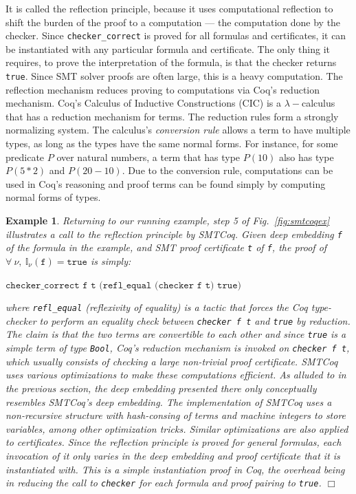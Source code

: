 \documentclass{article}
\newtheorem{example}{Example}[section]
\begin{document}
\begin{enumerate}
	It is called the reflection 
	principle, because it uses 
	computational reflection 
	to shift the burden of the 
	proof to a computation --- 
	the computation done by 
	the checker. Since 
	\texttt{checker\_correct}
	is proved for all formulas 
	and certificates, it can be 
	instantiated with any 
	particular formula and 
	certificate. The only thing it 
	requires, to 
	prove the interpretation of 
	the formula, is that the checker
	returns \texttt{true}.
	Since SMT solver proofs are 
	often large, this is a 
	heavy computation. The
	reflection mechanism reduces
	proving to computations via 
	Coq's reduction mechanism.
	Coq's Calculus of Inductive 
	Constructions (CIC) is a 
	$\lambda-$calculus that has a 
	reduction mechanism for terms. The
	reduction rules form a strongly 
	normalizing system. The calculus's
	\textit{conversion rule} allows a 
	term to have multiple types, as long as 
	the types have the same normal forms. 
	For instance, for some predicate $P$ 
	over natural numbers, a term that 
	has type $P(10)$ also has type 
	$P(5*2)$ and $P(20-10)$. Due 
	to the conversion rule, 
	computations can be used in Coq's 
	reasoning and proof terms can be 
	found simply by computing normal 
	forms of types.
\end{enumerate}
	
	\begin{example}
	\em Returning to our running example, 
	step 5 of 
	Fig.~\ref{fig:smtcoqex} illustrates
	a call to the reflection principle by
	SMTCoq. Given 
	deep embedding \texttt{f}
	of the formula in the example, and 
	SMT proof certificate \texttt{t} of 
	\texttt{f}, the proof of $\forall\ \nu,\ 
	\mathbb{I}_{\nu}(\texttt{f}) = 
	\texttt{true}$ is simply:
	\begin{center}
		$\texttt{checker\_correct f t
			(refl\_equal (checker f t) true)}$
	\end{center}
	where \texttt{refl\_equal} 
	(reflexivity of equality) is a tactic
	that forces the Coq type-checker to 
	perform an equality check between 
	\texttt{checker f t} and 
	\texttt{true} by reduction. 
	The claim is that the two 
	terms are convertible to each other
	and since \texttt{true} is a simple 
	term of type \texttt{Bool}, 
	Coq's reduction mechanism is 
	invoked on \texttt{checker f t},
	which usually consists of checking
	a large non-trivial proof certificate. 
	SMTCoq uses various optimizations 
	to make these computations efficient.
	As alluded to in the previous section,
	the deep embedding presented there 
	only conceptually resembles SMTCoq's
	deep embedding. The implementation 
	of SMTCoq uses a non-recursive 
	structure with hash-consing of terms
	and machine integers to store variables,
	among other optimization tricks.
	Similar optimizations are also 
	applied to certificates.
	Since the reflection principle is 
	proved for general formulas, 
	each invocation of it only varies
	in the deep embedding and proof 
	certificate that it is instantiated
	with. This is a simple instantiation
	proof in Coq, the overhead
	being in reducing the call to 
	\texttt{checker} for each 
	formula and proof pairing to 
	\texttt{true}.
	\hfill $\Box$
	\end{example}
\end{document}

